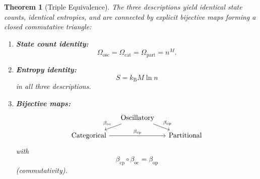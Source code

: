 \documentclass[11pt,twocolumn,a4paper]{article}
\newtheorem{theorem}{Theorem}[section]
\newcommand{\kb}{k_{\mathrm{B}}}
\begin{document}
\begin{theorem}[Triple Equivalence]
\label{thm:triple-equivalence}
The three descriptions yield identical state counts, identical
entropies, and are connected by explicit bijective maps forming a
closed commutative triangle:

\begin{enumerate}[label=(\alph*),leftmargin=*]
\item \textbf{State count identity:}
\begin{equation}
\Omega_{\mathrm{osc}} = \Omega_{\mathrm{cat}}
  = \Omega_{\mathrm{part}} = n^M.
\label{eq:state-count-identity}
\end{equation}

\item \textbf{Entropy identity:}
\begin{equation}
S = \kb M \ln n
\label{eq:entropy-identity}
\end{equation}
in all three descriptions.

\item \textbf{Bijective maps:}
\begin{equation}
\begin{tikzcd}[column sep=small, row sep=small]
& \text{Oscillatory} \arrow[dl, "\beta_{\mathrm{oc}}"'] \arrow[dr, "\beta_{\mathrm{op}}"] & \\
\text{Categorical} \arrow[rr, "\beta_{\mathrm{cp}}"] & & \text{Partitional}
\end{tikzcd}
\label{eq:commutative-triangle}
\end{equation}
with $$\beta_{\mathrm{cp}} \circ \beta_{\mathrm{oc}} = \beta_{\mathrm{op}}$$ (commutativity).
\end{enumerate}
\end{theorem}
\end{document}
